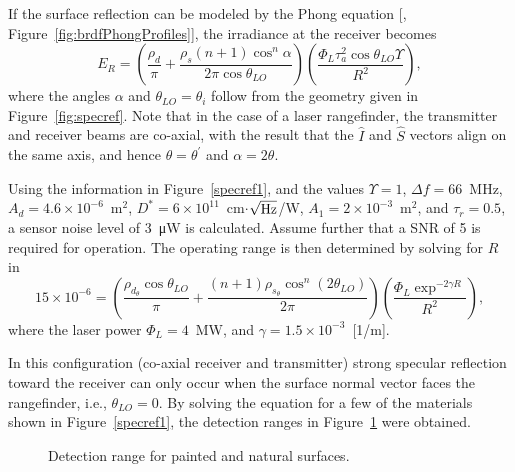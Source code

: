\FloatBarrier


If the surface reflection can be modeled by the Phong equation [, Figure~\ref{fig:brdfPhongProfiles}], the irradiance at the receiver becomes
\begin{equation}
E_R = 
\left(
\frac{\rho_d}{\pi} + \frac{\rho_s(n+1)\cos^n\alpha}{2\pi\cos\theta_{LO}}
\right)
\left(\frac{
\Phi_L \tau^2_{a} \cos\theta_{LO}\Upsilon}{ R^2 } %
\right),
\label{lrfi4}
\end{equation}
where the angles $\alpha$ and $\theta_{LO}=\theta_i$ follow from the geometry given in Figure~\ref{fig:specref}. Note that in the case of a laser rangefinder, the transmitter and receiver beams are co-axial, with the result that the $\widehat{I}$ and $\widehat{S}$ vectors align on the same axis, and hence $\theta=\theta^\prime$ and $\alpha=2\theta$.

Using the information in Figure~\ref{specref1},  and the values $\Upsilon = 1$, 
$\Delta f=66$~MHz, $A_d=4.6\times10^{-6}$~m$^2$,
$D^\ast=6\times10^{11}$~cm$\cdot$$\sqrt{\rm Hz}$/W, $A_1=2\times10^{-3}$~m$^2$,
and $\tau_r=0.5$, a sensor noise level of 3~\si{\micro\watt}{} is calculated.
Assume further that a SNR of 5 is required for
operation. The operating range is then determined by solving for $R$ in
\begin{equation}
15\times 10^{-6} = \left(
\frac{\rho_{d_\theta}\cos \theta_{LO}}{\pi}+
\frac{(n+1)\rho_{s_\theta}\cos^n (2\theta_{LO})}{2\pi}
\right)
\left(\frac{
\Phi_L \exp^{-2\gamma R}}{ R^2 }
\right),
\label{lrfi5}
\end{equation}
where the laser power $\Phi_L=4$~MW, and $\gamma=1.5\times10^{-3}$~[1/m].

In this configuration (co-axial receiver and transmitter) strong specular reflection toward the receiver can only occur when the surface normal vector faces the rangefinder, i.e., $\theta_{LO}=0$. By solving the equation for a few of the materials shown in Figure~\ref{specref1}, the detection ranges in Figure~\ref{specref2} were obtained.

\begin{figure}[h]
    \centering
    \caption{\label{specref2}Detection range for painted and natural surfaces.}
    \end{figure}

